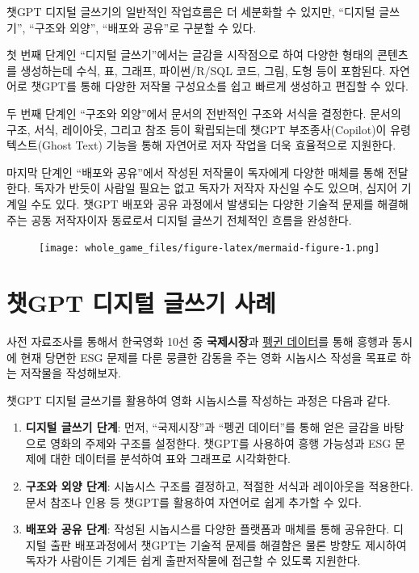 \documentclass[
  letterpaper,
]{book}
\begin{document}
챗GPT 디지털 글쓰기의 일반적인 작업흐름은 더 세분화할 수 있지만,
``디지털 글쓰기'', ``구조와 외양'', ``배포와 공유''로 구분할 수 있다.

첫 번째 단계인 ``디지털 글쓰기''에서는 글감을 시작점으로 하여 다양한
형태의 콘텐츠를 생성하는데 수식, 표, 그래프, 파이썬/R/SQL 코드, 그림,
도형 등이 포함된다. 자연어로 챗GPT를 통해 다양한 저작물 구성요소를 쉽고
빠르게 생성하고 편집할 수 있다.

두 번째 단계인 ``구조와 외양''에서 문서의 전반적인 구조와 서식을
결정한다. 문서의 구조, 서식, 레이아웃, 그리고 참조 등이 확립되는데 챗GPT
부조종사(Copilot)이 유령 텍스트(Ghost Text) 기능을 통해 자연어로 저자
작업을 더욱 효율적으로 지원한다.

마지막 단계인 ``배포와 공유''에서 작성된 저작물이 독자에게 다양한 매체를
통해 전달한다. 독자가 반듯이 사람일 필요는 없고 독자가 저작자 자신일
수도 있으며, 심지어 기계일 수도 있다. 챗GPT 배포와 공유 과정에서
발생되는 다양한 기술적 문제를 해결해주는 공동 저작자이자 동료로서 디지털
글쓰기 전체적인 흐름을 완성한다.

\begin{figure}[H]

{\centering \texttt{[image: whole\_game\_files/figure-latex/mermaid-figure-1.png]}

}

\end{figure}

\hypertarget{uxcc57gpt-uxb514uxc9c0uxd138-uxae00uxc4f0uxae30-uxc0acuxb840}{%
\section{챗GPT 디지털 글쓰기
사례}\label{uxcc57gpt-uxb514uxc9c0uxd138-uxae00uxc4f0uxae30-uxc0acuxb840}}

사전 자료조사를 통해서 한국영화 10선 중 \textbf{국제시장}과
\href{https://r2bit.com/chatGPT/palmer_penguins.html}{펭귄 데이터}를
통해 흥행과 동시에 현재 당면한 ESG 문제를 다룬 뭉클한 감동을 주는 영화
시놉시스 작성을 목표로 하는 저작물을 작성해보자.

챗GPT 디지털 글쓰기를 활용하여 영화 시놉시스를 작성하는 과정은 다음과
같다.

\begin{enumerate}
\def\labelenumi{\arabic{enumi}.}
\item
  \textbf{디지털 글쓰기 단계}: 먼저, ``국제시장''과 ``펭귄 데이터''를
  통해 얻은 글감을 바탕으로 영화의 주제와 구조를 설정한다. 챗GPT를
  사용하여 흥행 가능성과 ESG 문제에 대한 데이터를 분석하여 표와 그래프로
  시각화한다.
\item
  \textbf{구조와 외양 단계}: 시놉시스 구조를 결정하고, 적절한 서식과
  레이아웃을 적용한다. 문서 참조나 인용 등 챗GPT를 활용하여 자연어로
  쉽게 추가할 수 있다.
\item
  \textbf{배포와 공유 단계}: 작성된 시놉시스를 다양한 플랫폼과 매체를
  통해 공유한다. 디지털 출판 배포과정에서 챗GPT는 기술적 문제를 해결함은
  물론 방향도 제시하여 독자가 사람이든 기계든 쉽게 출판저작물에 접근할
  수 있도록 지원한다.
\end{enumerate}
\end{document}
